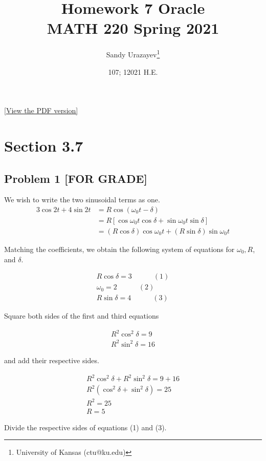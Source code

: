 \documentclass[12pt]{article}
\author{Sandy Urazayev\thanks{University of Kansas (ctu@ku.edu)}}
\date{107; 12021 H.E.}
\title{Homework 7 Oracle\\\medskip
\large MATH 220 Spring 2021}
\begin{document}
\maketitle
\href{./index.pdf}{[View the PDF version]​}
\section*{Section 3.7}
\label{sec:org39d6e9f}
\subsection*{Problem 1 [FOR GRADE]}
\label{sec:org5ef4a4e}
We wish to write the two sinusoidal terms as one.
\begin{align*}
	3 \cos 2 t+4 \sin 2 t & =R \cos \left(\omega_{0} t-\delta\right)                                   \\
	                      & =R\left[\cos \omega_{0} t \cos \delta+\sin \omega_{0} t \sin \delta\right] \\
	                      & =(R \cos \delta) \cos \omega_{0} t+(R \sin \delta) \sin \omega_{0} t
\end{align*}

Matching the coefficients, we obtain the following system of equations for
\(\omega_{0}, R\), and \(\delta\).

\begin{align*}
R \cos \delta=3 \quad \quad \quad (1)\\
\omega_{0}=2 \quad \quad \quad (2)\\
R \sin \delta=4 \quad \quad \quad (3)
\end{align*}

Square both sides of the first and third equations

\begin{align*}
R^{2} \cos ^{2} \delta=9 \\
R^{2} \sin ^{2} \delta=16
\end{align*}

and add their respective sides.

\begin{align*}
R^{2} \cos ^{2} \delta+R^{2} \sin ^{2} \delta=9+16 \\
R^{2}\left(\cos ^{2} \delta+\sin ^{2} \delta\right)=25 \\
R^{2}=25 \\
R=5
\end{align*}

Divide the respective sides of equations (1) and (3).
\end{document}

